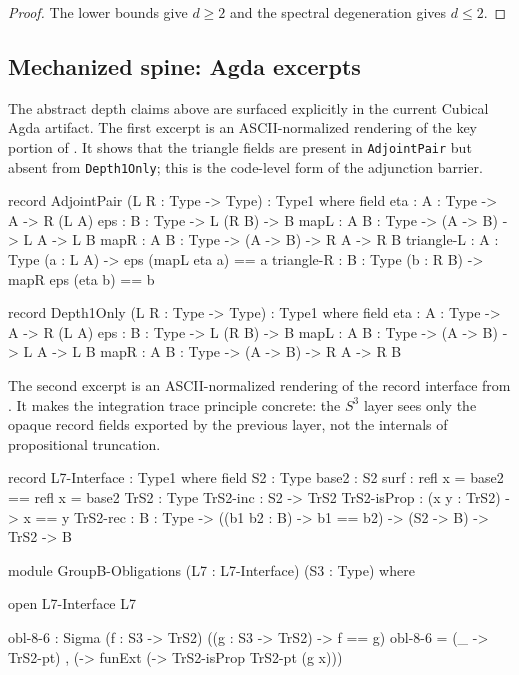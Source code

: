 \documentclass{lmcs}
\theoremstyle{plain}
\theoremstyle{definition}
\theoremstyle{remark}
\begin{document}
\begin{proof}
The lower bounds give $d\geq 2$ and the spectral degeneration gives $d\leq 2$.
\end{proof}

\subsection{Mechanized spine: Agda excerpts}

The abstract depth claims above are surfaced explicitly in the current Cubical Agda artifact.
The first excerpt is an ASCII-normalized rendering of the key portion of .
It shows that the triangle fields are present in \texttt{AdjointPair} but absent from \texttt{Depth1Only}; this is the code-level form of the adjunction barrier.

\begin{code}
record AdjointPair (L R : Type -> Type) : Type1 where
  field
    eta   : {A : Type} -> A -> R (L A)
    eps   : {B : Type} -> L (R B) -> B
    mapL  : {A B : Type} -> (A -> B) -> L A -> L B
    mapR  : {A B : Type} -> (A -> B) -> R A -> R B
    triangle-L : {A : Type} (a : L A) -> eps (mapL eta a) == a
    triangle-R : {B : Type} (b : R B) -> mapR eps (eta b) == b

record Depth1Only (L R : Type -> Type) : Type1 where
  field
    eta  : {A : Type} -> A -> R (L A)
    eps  : {B : Type} -> L (R B) -> B
    mapL : {A B : Type} -> (A -> B) -> L A -> L B
    mapR : {A B : Type} -> (A -> B) -> R A -> R B
\end{code}

The second excerpt is an ASCII-normalized rendering of the record interface from .
It makes the integration trace principle concrete: the $S^3$ layer sees only the opaque record fields exported by the previous layer, not the internals of propositional truncation.

\begin{code}
record L7-Interface : Type1 where
  field
    S2          : Type
    base2       : S2
    surf        : refl {x = base2} == refl {x = base2}
    TrS2        : Type
    TrS2-inc    : S2 -> TrS2
    TrS2-isProp : (x y : TrS2) -> x == y
    TrS2-rec    : {B : Type}
                -> ((b1 b2 : B) -> b1 == b2)
                -> (S2 -> B) -> TrS2 -> B

module GroupB-Obligations
  (L7 : L7-Interface) (S3 : Type) where

  open L7-Interface L7

  obl-8-6 : Sigma (f : S3 -> TrS2) ((g : S3 -> TrS2) -> f == g)
  obl-8-6 = (\_ -> TrS2-pt) , (\g -> funExt (\x -> TrS2-isProp TrS2-pt (g x)))
\end{code}
\end{document}
